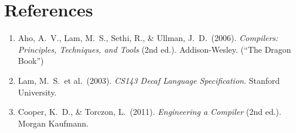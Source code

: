 \documentclass[12pt,a4paper]{article}
\begin{document}
\section*{References}
\begin{enumerate}
  \item Aho, A.\ V., Lam, M.\ S., Sethi, R., \& Ullman, J.\ D.\ (2006).
        \textit{Compilers: Principles, Techniques, and Tools} (2nd ed.).
        Addison-Wesley. (``The Dragon Book'')
  \item Lam, M.\ S.\ et al.\ (2003). \textit{CS143 Decaf Language Specification}.
        Stanford University.
  \item Cooper, K.\ D., \& Torczon, L.\ (2011).
        \textit{Engineering a Compiler} (2nd ed.). Morgan Kaufmann.
\end{enumerate}
\end{document}
